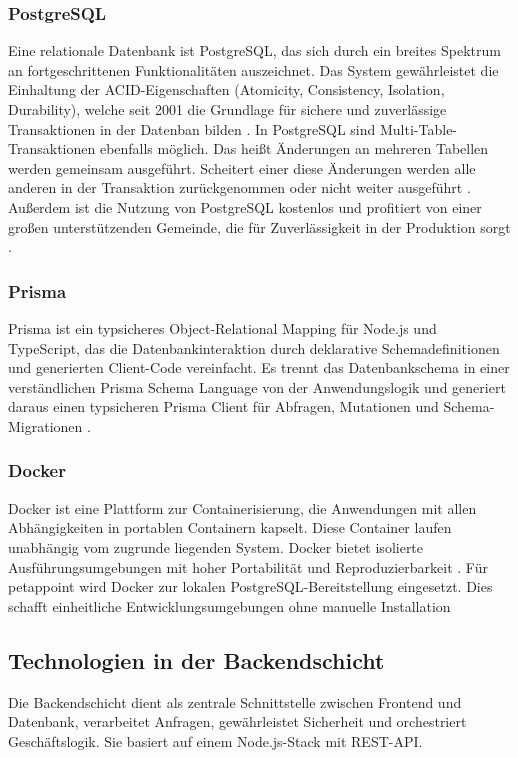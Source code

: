 \subsubsection{PostgreSQL}

Eine relationale Datenbank ist PostgreSQL, das sich durch ein breites Spektrum an fortgeschrittenen Funktionalitäten auszeichnet. Das System gewährleistet die Einhaltung der ACID-Eigenschaften (Atomicity, Consistency, Isolation, Durability), welche seit 2001 die Grundlage für sichere und zuverlässige Transaktionen in der Datenban bilden \cite{postgresql_about}. In PostgreSQL sind Multi-Table-Transaktionen ebenfalls möglich. Das heißt Änderungen an mehreren Tabellen werden gemeinsam ausgeführt. Scheitert einer diese Änderungen werden alle anderen in der Transaktion zurückgenommen oder nicht weiter ausgeführt \cite{postgresql_transactions}. Außerdem ist die Nutzung von PostgreSQL kostenlos \cite{postgresql_free} und profitiert von einer großen unterstützenden Gemeinde, die für Zuverlässigkeit in der Produktion sorgt \cite{postgresql_community}.

\subsubsection{Prisma}
Prisma ist ein typsicheres Object-Relational Mapping für Node.js und TypeScript, das die Datenbankinteraktion durch deklarative Schemadefinitionen und generierten Client-Code vereinfacht. Es trennt das Datenbankschema in einer verständlichen Prisma Schema Language von der Anwendungslogik und generiert daraus einen typsicheren Prisma Client für Abfragen, Mutationen und Schema-Migrationen \cite{prisma-docs}.

\subsubsection{Docker}
Docker ist eine Plattform zur Containerisierung, die Anwendungen mit allen Abhängigkeiten in portablen Containern kapselt. Diese Container laufen unabhängig vom zugrunde liegenden System. Docker bietet isolierte Ausführungsumgebungen mit hoher Portabilität und Reproduzierbarkeit \cite{docker-docs}. Für petappoint wird Docker zur lokalen PostgreSQL-Bereitstellung eingesetzt. Dies schafft einheitliche Entwicklungsumgebungen ohne manuelle Installation

\subsection{Technologien in der Backendschicht}
Die Backendschicht dient als zentrale Schnittstelle zwischen Frontend und Datenbank, verarbeitet Anfragen, gewährleistet Sicherheit und orchestriert Geschäftslogik. Sie basiert auf einem Node.js-Stack mit REST-API.

